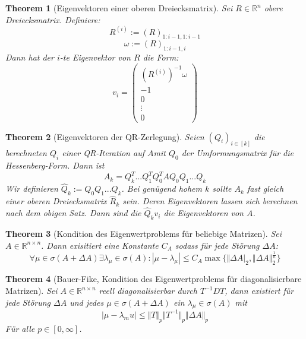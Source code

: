 \documentclass[10pt,a4paper]{article}
\newtheorem{theorem}{Theorem}
\begin{document}
	\begin{theorem}[Eigenvektoren einer oberen Dreiecksmatrix]
		Sei $R\in \mathbb{R}^n$ obere Dreiecksmatrix. Definiere:
		$$R^{(i)} := (R)_{1:i-1,1:i-1}$$
		$$\omega := (R)_{1:i-1,i}$$
		Dann hat der $i$-te Eigenvektor von $R$ die Form:
		$$v_i = \begin{pmatrix}
			(R^(i))^{-1}\omega \\
			-1 \\
			0 \\
			\vdots \\
			0
		\end{pmatrix}$$ 
	\end{theorem}
	\begin{theorem}[Eigenvektoren der QR-Zerlegung]
		Seien $(Q_i)_{i\in[k]}$ die berechneten $Q_i$ einer QR-Iteration auf $A$mit $Q_0$ der Umformungsmatrix für die Hessenberg-Form. Dann ist $$A_k = Q_k^T...Q_1^TQ_0^TAQ_0Q_1...Q_k$$
		Wir definieren $\hat{Q}_k := Q_0Q_1...Q_k$. Bei genügend hohem $k$ sollte $A_k$ fast gleich einer oberen Dreiecksmatrix $\hat{R}_k$ sein. Deren Eigenvektoren lassen sich berechnen nach dem obigen Satz. Dann sind die $\hat{Q}_kv_i$ die Eigenvektoren von $A$.
	\end{theorem}
	\begin{theorem}[Kondition des Eigenwertproblems für beliebige Matrizen]
		Sei $A\in \mathbb{R}^{n\times n}$. Dann exisitiert eine Konstante  $C_A$ sodass für jede Störung $\Delta A$: 
		$$\forall \mu \in \sigma(A+\Delta A) \exists \lambda_\mu\in \sigma(A): |\mu - \lambda_\mu| \leq C_A \max \{\Vert\Delta A\vert_2, \Vert \Delta A\Vert_2^{\frac{1}{n}}\}$$
	\end{theorem}
	\begin{theorem}[Bauer-Fike, Kondition des Eigenwertproblems für diagonalisierbare Matrizen]
		Sei $A\in \mathbb{R}^{n\times n}$ reell diagonalisierbar durch $T^{-1}DT$, dann existiert für jede Störung $\Delta A$ und jedes $\mu \in \sigma(A+\Delta A)$ ein $\lambda_\mu\in \sigma(A)$ mit
		$$|\mu-\lambda_mu|\leq \Vert T\Vert_p\Vert T^{-1}\Vert_p\Vert\Delta A\Vert_p$$
		Für alle $p \in [0, \infty]$.
	\end{theorem}
\end{document}
